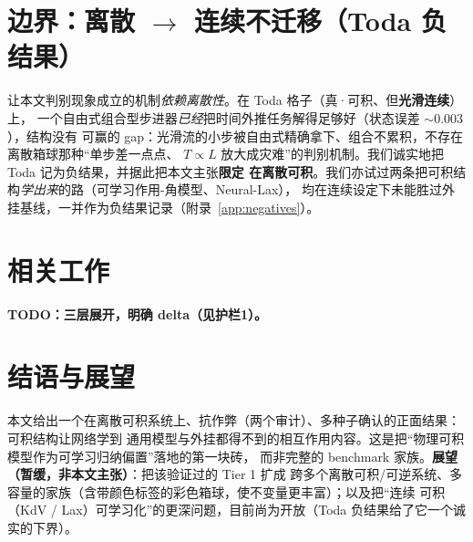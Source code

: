 \documentclass[11pt]{article}
\theoremstyle{definition}
\theoremstyle{plain}
\begin{document}
\section{边界：离散 $\to$ 连续不迁移（Toda 负结果）}\label{sec:boundary}
让本文判别现象成立的机制\emph{依赖离散性}。在 Toda 格子（真·可积、但\textbf{光滑连续}）上，
一个自由式组合型步进器\emph{已经}把时间外推任务解得足够好（状态误差 $\sim0.003$），结构没有
可赢的 gap：光滑流的小步被自由式精确拿下、组合不累积，不存在离散箱球那种“单步差一点点、
$T\propto L$ 放大成灾难”的判别机制。我们诚实地把 Toda 记为负结果，并据此把本文主张\textbf{限定
在离散可积}。我们亦试过两条把可积结构\emph{学出来}的路（可学习作用-角模型、Neural-Lax），
均在连续设定下未能胜过外挂基线，一并作为负结果记录（附录~\ref{app:negatives}）。

\section{相关工作}\label{sec:related}
\textbf{TODO：三层展开，明确 delta（见护栏1）。}

\section{结语与展望}\label{sec:outlook}
本文给出一个在离散可积系统上、抗作弊（两个审计）、多种子确认的正面结果：可积结构让网络学到
通用模型与外挂都得不到的相互作用内容。这是把“物理可积模型作为可学习归纳偏置”落地的第一块砖，
而非完整的 benchmark 家族。\textbf{展望（暂缓，非本文主张）}：把该验证过的 Tier 1 扩成
跨多个离散可积/可逆系统、多容量的家族（含带颜色标签的彩色箱球，使不变量更丰富）；以及把“连续
可积（KdV / Lax）可学习化”的更深问题，目前尚为开放（Toda 负结果给了它一个诚实的下界）。

\appendix
\end{document}

